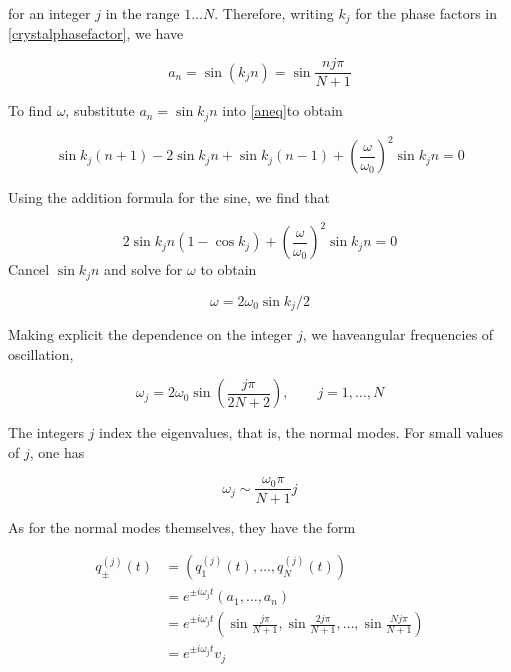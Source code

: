 for an integer $j$ in the range $1\ldots N$.  Therefore, writing $k_j$ for the phase factors in \eqref{crystalphasefactor}, we have

\begin{equation}
a_n = \sin(k_jn) = \sin \frac{nj\pi}{N+1}
\end{equation}


To find $\omega$, substitute $a_n = \sin k_jn$ into \eqref{aneq}to obtain

\begin{equation}
\sin k_j(n+1) - 2\sin k_jn + \sin k_j(n-1)
  + \left(\frac{\omega}{\omega_0}\right)^2  \sin k_jn  = 0
\end{equation}

Using the addition formula for the sine, we find that

\begin{equation}
2\sin k_jn (1 - \cos k_j)
+ \left(\frac{\omega}{\omega_0}\right)^2 \sin k_jn = 0
\end{equation}
Cancel $\sin k_jn$ and solve for $\omega$ to obtain

\begin{equation}
\omega = 2\omega_0\sin k_j/2
\end{equation}

Making explicit the dependence on the integer $j$, we haveangular frequencies of oscillation,

\begin{equation}
\omega_j = 2\omega_0 \sin\left( \frac{j\pi}{2N+2} \right),
\qquad j = 1, \ldots, N
\end{equation}

The integers $j$ index the eigenvalues, that is, the normal modes. For small values of $j$, one has

\begin{equation}
\omega_j \sim \frac{\omega_0\pi}{N+1} j
\end{equation}

As for the normal modes themselves, they have the form

\begin{align}
q^{(j)}_\pm(t) &= (q^{(j)}_1(t), \ldots, q^{(j)}_N(t)) \\
&= e^{\pm i\omega_j t}(a_1, \ldots, a_n) \\
&= e^{\pm i\omega_j t}\left(\sin \frac{j\pi}{N+1}, \sin \frac{2j\pi}{N+1},\ldots, \sin \frac{Nj\pi}{N+1}\right) \\
&=  e^{\pm i\omega_j t} v_j
\end{align}

